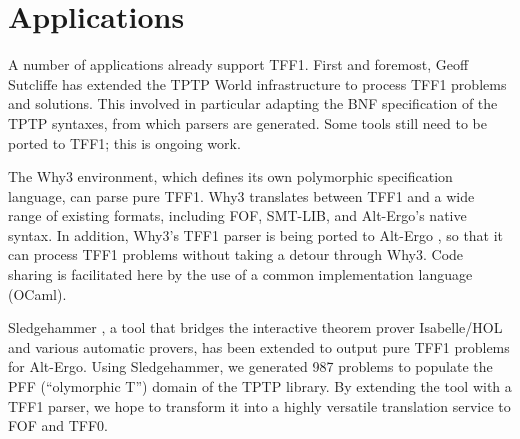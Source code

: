 \section{Applications}
\label{sec_apps}

A number of applications already support TFF1. First and foremost, Geoff
Sutcliffe has extended the TPTP World infrastructure to process TFF1 problems
and solutions. This involved in particular adapting the BNF specification of the
TPTP syntaxes, from which parsers are generated. Some tools still need to be
ported to TFF1; this is ongoing work.

The Why3 \cite{bobot-et-al-2011} environment, which defines its own polymorphic
specification language, can parse pure TFF1. Why3 translates
between TFF1 and a wide range of existing formats, including FOF, SMT-LIB, and
Alt-Ergo's native syntax. In addition, Why3's TFF1 parser is being ported to
Alt-Ergo \cite{bobot-et-al-2008}, so that it can process TFF1 problems without
taking a detour through Why3. Code sharing is facilitated here by the use of
a common implementation language (OCaml).

Sledgehammer \cite{paulson-blanchette-2010}, a tool that bridges the interactive
theorem prover Isabelle\slash HOL and various automatic provers, has been
extended to output pure TFF1 problems for Alt-Ergo. Using Sledgehammer, we
generated 987 problems to populate the PFF (``olymorphic T'')
domain of the TPTP library. By extending the tool with a TFF1 parser,
we hope to transform it into a highly versatile translation service to FOF and
TFF0.



